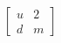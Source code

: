 \documentclass[border=0pt]{standalone}
\begin{document}
$\begin{bmatrix}
u & 2 \\
d & m
\end{bmatrix}$
\end{document}
